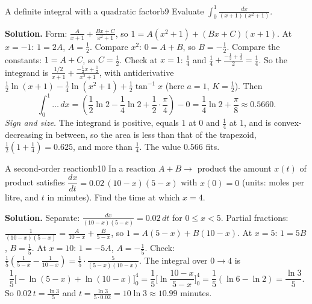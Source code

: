 \documentclass[11pt]{article}
\begin{document}
\begin{exmp}{A definite integral with a quadratic factor}{b9}
Evaluate $\displaystyle\int_0^1\frac{dx}{(x+1)(x^2+1)}$.

\textbf{Solution.} Form: $\frac A{x+1}+\frac{Bx+C}{x^2+1}$, so $1=A(x^2+1)+(Bx+C)(x+1)$. At $x=-1$: $1=2A$, $A=\frac12$. Compare $x^2$: $0=A+B$, so $B=-\frac12$. Compare the constants: $1=A+C$, so $C=\frac12$. Check at $x=1$: $\frac14$ and $\frac14+\frac{-\frac12+\frac12}{2}=\frac14$. So the integrand is $\frac{1/2}{x+1}+\frac{-\frac12x+\frac12}{x^2+1}$, with antiderivative $\frac12\ln(x+1)-\frac14\ln(x^2+1)+\frac12\tan^{-1}x$ (here $a=1$, $K=\frac12$). Then
\[\int_0^1\ldots\,dx=\left(\frac12\ln2-\frac14\ln2+\frac12\cdot\frac\pi4\right)-0=\frac14\ln2+\frac\pi8\approx0.5660 .\]
\emph{Sign and size.} The integrand is positive, equals $1$ at $0$ and $\frac14$ at $1$, and is convex-decreasing in between, so the area is less than that of the trapezoid, $\frac12\left(1+\frac14\right)=0.625$, and more than $\frac14$. The value $0.566$ fits.
\end{exmp}

\begin{exmp}{A second-order reaction}{b10}
In a reaction $A+B\to$ product the amount $x(t)$ of product satisfies $\dfrac{dx}{dt}=0.02\,(10-x)(5-x)$ with $x(0)=0$ (units: moles per litre, and $t$ in minutes). Find the time at which $x=4$.

\textbf{Solution.} Separate: $\frac{dx}{(10-x)(5-x)}=0.02\,dt$ for $0\le x<5$. Partial fractions: $\frac1{(10-x)(5-x)}=\frac A{10-x}+\frac B{5-x}$, so $1=A(5-x)+B(10-x)$. At $x=5$: $1=5B$, $B=\frac15$. At $x=10$: $1=-5A$, $A=-\frac15$. Check: $\frac15\left(\frac1{5-x}-\frac1{10-x}\right)=\frac15\cdot\frac{5}{(5-x)(10-x)}$. The integral over $0\to4$ is
\[\frac15\Big[-\ln(5-x)+\ln(10-x)\Big]_0^4=\frac15\Big[\ln\frac{10-x}{5-x}\Big]_0^4=\frac15\left(\ln6-\ln2\right)=\frac{\ln3}5 .\]
So $0.02\,t=\frac{\ln3}5$ and $t=\frac{\ln3}{5\cdot0.02}=10\ln3\approx10.99$ minutes.
\end{exmp}
\end{document}
